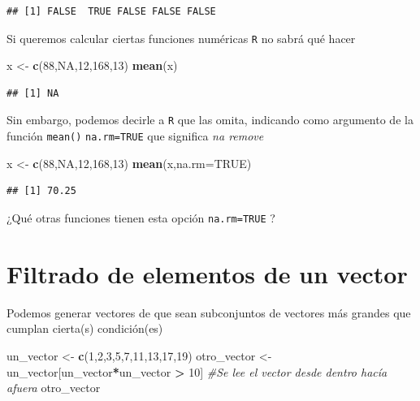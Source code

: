 \documentclass[
]{book}
\newenvironment{Shaded}{\begin{snugshade}}{\end{snugshade}}
\newcommand{\AttributeTok}[1]{\textcolor[rgb]{0.13,0.29,0.53}{#1}}
\newcommand{\CommentTok}[1]{\textcolor[rgb]{0.56,0.35,0.01}{\textit{#1}}}
\newcommand{\ConstantTok}[1]{\textcolor[rgb]{0.56,0.35,0.01}{#1}}
\newcommand{\DecValTok}[1]{\textcolor[rgb]{0.00,0.00,0.81}{#1}}
\newcommand{\FunctionTok}[1]{\textcolor[rgb]{0.13,0.29,0.53}{\textbf{#1}}}
\newcommand{\NormalTok}[1]{#1}
\newcommand{\OtherTok}[1]{\textcolor[rgb]{0.56,0.35,0.01}{#1}}
\newcommand{\SpecialCharTok}[1]{\textcolor[rgb]{0.81,0.36,0.00}{\textbf{#1}}}
\begin{document}
\begin{verbatim}
## [1] FALSE  TRUE FALSE FALSE FALSE
\end{verbatim}

Si queremos calcular ciertas funciones numéricas \texttt{R} no sabrá qué hacer

\begin{Shaded}
\begin{Highlighting}[]
\NormalTok{x }\OtherTok{\textless{}{-}} \FunctionTok{c}\NormalTok{(}\DecValTok{88}\NormalTok{,}\ConstantTok{NA}\NormalTok{,}\DecValTok{12}\NormalTok{,}\DecValTok{168}\NormalTok{,}\DecValTok{13}\NormalTok{)}
\FunctionTok{mean}\NormalTok{(x)}
\end{Highlighting}
\end{Shaded}

\begin{verbatim}
## [1] NA
\end{verbatim}

Sin embargo, podemos decirle a \texttt{R} que las omita, indicando como argumento de la función \texttt{mean()} \texttt{na.rm=TRUE} que significa \emph{na remove}

\begin{Shaded}
\begin{Highlighting}[]
\NormalTok{x }\OtherTok{\textless{}{-}} \FunctionTok{c}\NormalTok{(}\DecValTok{88}\NormalTok{,}\ConstantTok{NA}\NormalTok{,}\DecValTok{12}\NormalTok{,}\DecValTok{168}\NormalTok{,}\DecValTok{13}\NormalTok{)}
\FunctionTok{mean}\NormalTok{(x,}\AttributeTok{na.rm=}\ConstantTok{TRUE}\NormalTok{)}
\end{Highlighting}
\end{Shaded}

\begin{verbatim}
## [1] 70.25
\end{verbatim}

¿Qué otras funciones tienen esta opción \texttt{na.rm=TRUE} ?

\section{Filtrado de elementos de un vector}\label{filtrado-de-elementos-de-un-vector}

Podemos generar vectores de que sean subconjuntos de vectores más grandes que cumplan cierta(s) condición(es)

\begin{Shaded}
\begin{Highlighting}[]
\NormalTok{un\_vector }\OtherTok{\textless{}{-}} \FunctionTok{c}\NormalTok{(}\DecValTok{1}\NormalTok{,}\DecValTok{2}\NormalTok{,}\DecValTok{3}\NormalTok{,}\DecValTok{5}\NormalTok{,}\DecValTok{7}\NormalTok{,}\DecValTok{11}\NormalTok{,}\DecValTok{13}\NormalTok{,}\DecValTok{17}\NormalTok{,}\DecValTok{19}\NormalTok{) }
\NormalTok{otro\_vector }\OtherTok{\textless{}{-}}\NormalTok{ un\_vector[un\_vector}\SpecialCharTok{*}\NormalTok{un\_vector }\SpecialCharTok{\textgreater{}} \DecValTok{10}\NormalTok{]   }\CommentTok{\#Se lee el vector desde dentro hacía afuera}
\NormalTok{otro\_vector}
\end{Highlighting}
\end{Shaded}
\end{document}
